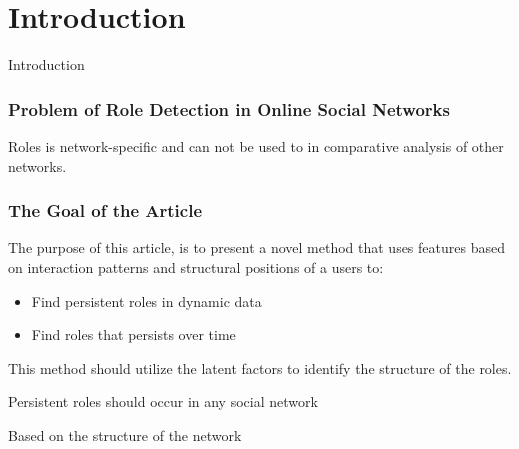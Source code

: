 \section{Introduction}

\begin{frame}
     \begin{center}
     	\huge Introduction
     \end{center}
\end{frame}

\begin{frame}
\frametitle{Problem of Role Detection in Online Social Networks}
Roles is network-specific and can not be used to in comparative analysis of other networks.


\end{frame}

\begin{frame}
\frametitle{The Goal of the Article}
The purpose of this article, is to present a novel method that uses features based on interaction patterns and structural positions of a users to:
\begin{itemize}
\item Find persistent roles in dynamic data
\item Find roles that persists over time
\end{itemize}
This method should utilize the latent factors to identify the structure of the roles.

Persistent roles should occur in any social network

Based on the structure of the network
\end{frame}





